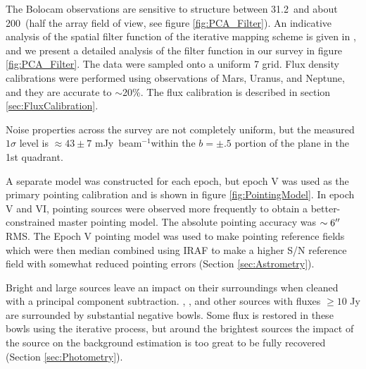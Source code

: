 \documentclass[12pt,preprint]{aastex}
\newcommand\jyb{Jy~beam$^{-1}$}
\newcommand{\bcamfwhm}{31.2\arcsec}
\begin{document}
The Bolocam observations are sensitive to structure between \bcamfwhm\ and
about 200\arcsec\ (half the array field of view, see figure
\ref{fig:PCA_Filter}).  An indicative analysis of the spatial filter function
of the iterative mapping scheme is given in \citet{enoch06}, and we present a detailed analysis
of the filter function in our survey in figure \ref{fig:PCA_Filter}.  The data were
sampled onto a uniform 7 grid.  Flux density calibrations were performed
using observations of Mars, Uranus, and Neptune, and they are accurate to
$\sim$20\%.  The flux calibration is described in section \ref{sec:FluxCalibration}.

Noise properties across the survey are not completely uniform, but the
measured $1\sigma$ level is $\approx43\pm7$ m\jyb within the
$b=\pm.5$ portion of the plane in the 1st quadrant.

A separate model was constructed for each epoch, but epoch V was used as the
primary pointing calibration and is shown in figure \ref{fig:PointingModel}.
In epoch V and VI, pointing sources were observed more frequently to obtain a
better-constrained master pointing model. The absolute pointing accuracy was
$\sim6\mbox{$^{\prime\prime}$}$ RMS.  The Epoch V pointing model was used to make pointing
reference fields which were then median combined using IRAF to make a higher
S/N reference field with somewhat reduced pointing errors (Section
\ref{sec:Astrometry}).


Bright and large sources leave an impact on their surroundings when
cleaned with a principal component subtraction.  ,
, and other sources with fluxes $\geq 10$ Jy are
surrounded by substantial negative bowls.  Some flux is restored in
these bowls using the iterative process, 
 but around the brightest sources the impact of the source on the
background estimation is too great to be fully recovered (Section
\ref{sec:Photometry}).
\end{document}
